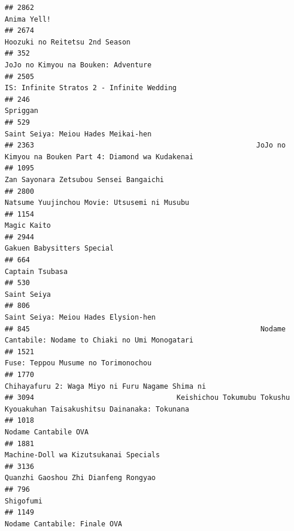 \documentclass[
]{article}
\begin{document}
\begin{verbatim}
## 2862                                                                                               Anima Yell!
## 2674                                                                            Hoozuki no Reitetsu 2nd Season
## 352                                                                        JoJo no Kimyou na Bouken: Adventure
## 2505                                                                 IS: Infinite Stratos 2 - Infinite Wedding
## 246                                                                                                   Spriggan
## 529                                                                        Saint Seiya: Meiou Hades Meikai-hen
## 2363                                                     JoJo no Kimyou na Bouken Part 4: Diamond wa Kudakenai
## 1095                                                                    Zan Sayonara Zetsubou Sensei Bangaichi
## 2800                                                              Natsume Yuujinchou Movie: Utsusemi ni Musubu
## 1154                                                                                               Magic Kaito
## 2944                                                                                Gakuen Babysitters Special
## 664                                                                                            Captain Tsubasa
## 530                                                                                                Saint Seiya
## 806                                                                       Saint Seiya: Meiou Hades Elysion-hen
## 845                                                       Nodame Cantabile: Nodame to Chiaki no Umi Monogatari
## 1521                                                                       Fuse: Teppou Musume no Torimonochou
## 1770                                                          Chihayafuru 2: Waga Miyo ni Furu Nagame Shima ni
## 3094                                  Keishichou Tokumubu Tokushu Kyouakuhan Taisakushitsu Dainanaka: Tokunana
## 1018                                                                                      Nodame Cantabile OVA
## 1881                                                                     Machine-Doll wa Kizutsukanai Specials
## 3136                                                                      Quanzhi Gaoshou Zhi Dianfeng Rongyao
## 796                                                                                                  Shigofumi
## 1149                                                                              Nodame Cantabile: Finale OVA

\end{verbatim}
\end{document}
